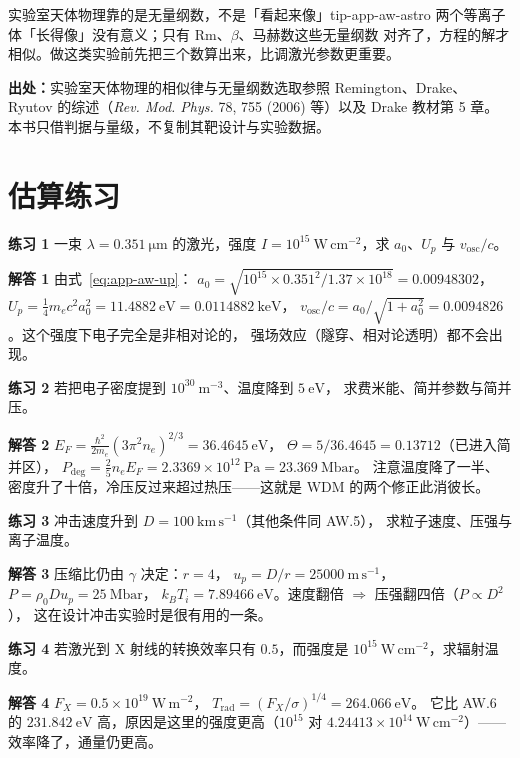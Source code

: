 \begin{tip}{实验室天体物理靠的是无量纲数，不是「看起来像」}{tip-app-aw-astro}
两个等离子体「长得像」没有意义；只有 $\mathrm{Rm}$、$\beta$、马赫数这些无量纲数
对齐了，方程的解才相似。做这类实验前先把三个数算出来，比调激光参数更重要。
\end{tip}

{\footnotesize
\textbf{出处：}实验室天体物理的相似律与无量纲数选取参照 Remington、Drake、
Ryutov 的综述（\emph{Rev. Mod. Phys.} 78, 755 (2006) 等）以及
Drake 教材第 5 章。
本书只借判据与量级，不复制其靶设计与实验数据。
}

\section{估算练习}
\label{sec:app-aw-problems}

\textbf{练习 1} 一束 $\lambda=0.351\ \mathrm{\mu m}$ 的激光，强度
$I=10^{15}\ \mathrm{W\,cm^{-2}}$，求 $a_0$、$U_p$ 与 $v_\mathrm{osc}/c$。

\textbf{解答 1} 由式~\eqref{eq:app-aw-up}：
$a_0=\sqrt{10^{15}\times0.351^2/1.37\times10^{18}}=0.00948302$，
$U_p=\frac{1}{4}m_ec^2a_0^2=11.4882\ \mathrm{eV}=0.0114882\ \mathrm{keV}$，
$v_\mathrm{osc}/c=a_0/\sqrt{1+a_0^2}=0.0094826$。这个强度下电子完全是非相对论的，
强场效应（隧穿、相对论透明）都不会出现。

\textbf{练习 2} 若把电子密度提到 $10^{30}\ \mathrm{m^{-3}}$、温度降到 $5\ \mathrm{eV}$，
求费米能、简并参数与简并压。

\textbf{解答 2} $E_F=\frac{\hbar^2}{2m_e}(3\pi^2n_e)^{2/3}=36.4645\ \mathrm{eV}$，
$\Theta=5/36.4645=0.13712$（已进入简并区），
$P_\mathrm{deg}=\frac{2}{5}n_eE_F=2.3369\times10^{12}\ \mathrm{Pa}=23.369\ \mathrm{Mbar}$。
注意温度降了一半、密度升了十倍，冷压反过来超过热压——这就是 WDM 的两个修正此消彼长。

\textbf{练习 3} 冲击速度升到 $D=100\ \mathrm{km\,s^{-1}}$（其他条件同 AW.5），
求粒子速度、压强与离子温度。

\textbf{解答 3} 压缩比仍由 $\gamma$ 决定：$r=4$，
$u_p=D/r=25000\ \mathrm{m\,s^{-1}}$，
$P=\rho_0Du_p=25\ \mathrm{Mbar}$，
$k_BT_i=7.89466\ \mathrm{eV}$。速度翻倍 $\Rightarrow$ 压强翻四倍（$P\propto D^2$），
这在设计冲击实验时是很有用的一条。

\textbf{练习 4} 若激光到 X 射线的转换效率只有 $0.5$，而强度是
$10^{15}\ \mathrm{W\,cm^{-2}}$，求辐射温度。

\textbf{解答 4} $F_X=0.5\times10^{19}\ \mathrm{W\,m^{-2}}$，
$T_\mathrm{rad}=(F_X/\sigma)^{1/4}=264.066\ \mathrm{eV}$。
它比 AW.6 的 $231.842\ \mathrm{eV}$ 高，原因是这里的强度更高（$10^{15}$ 对
$4.24413\times10^{14}\ \mathrm{W\,cm^{-2}}$）——效率降了，通量仍更高。

